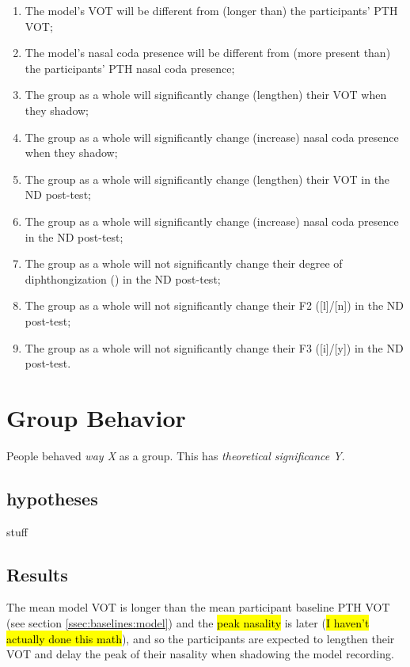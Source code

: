 \begin{enumerate}
    \item The model's VOT will be different from (longer than) the participants' PTH VOT;
    \item The model's nasal coda presence will be different from (more present than) the participants' PTH nasal coda presence;
    \item The group as a whole will significantly change (lengthen) their VOT when they shadow;
    \item The group as a whole will significantly change (increase) nasal coda presence when they shadow;
    \item The group as a whole will significantly change (lengthen) their VOT in the ND post-test;
    \item The group as a whole will significantly change (increase) nasal coda presence in the ND post-test;
    \item The group as a whole will not significantly change their degree of diphthongization (\textipa{[e]/[iE]}) in the ND post-test;
    \item The group as a whole will not significantly change their F2 ([l]/[n]) in the ND post-test;
    \item The group as a whole will not significantly change their F3 ([i]/[y]) in the ND post-test.
\end{enumerate}

\section{Group Behavior}
\label{sec:expint:group}

People behaved \textit{way X} as a group. This has \textit{theoretical significance Y}.

\subsection{hypotheses}
stuff

\subsection{Results}
\label{sec:expint:group:results}
 The mean model VOT is longer than the mean participant baseline PTH VOT (see section \ref{ssec:baselines:model}) and the \hl{peak nasality} is later (\hl{I haven't actually done this math}), and so the participants are expected to lengthen their VOT and delay the peak of their nasality when shadowing the model recording. %

